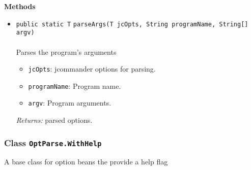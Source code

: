 \textbf{\sffamily Methods}
\begin{itemize}
\item \lstinline|public static T| \lstinline|parseArgs|\lstinline|(T jcOpts, String programName, String[] argv)|\\ \\[-0.6em]
Parses the program's arguments
\begin{itemize}
\item \lstinline|jcOpts|: jcommander options for parsing.
\item \lstinline|programName|: Program name.
\item \lstinline|argv|: Program arguments.
\end{itemize}

\emph{Returns:} parsed options.

\end{itemize}

\subsubsection{Class \lstinline|OptParse.WithHelp|}
A base class for option beans the provide a help flag \\
\noindent\begin{minipage}[t]{5cm}
\vspace{0.3em}
\hspace*{2em}
\vspace{0.3em}
\end{minipage}






